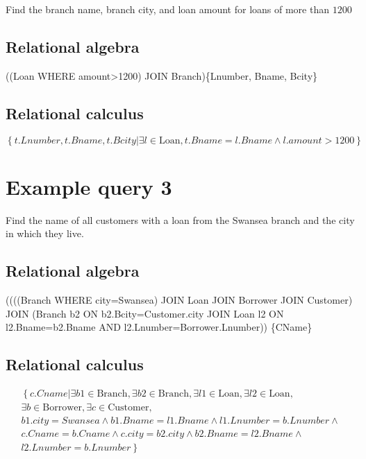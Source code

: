 \documentclass[
  14pt,
]{extarticle}
\begin{document}
Find the branch name, branch city, and loan amount for loans of more
than \(1200\)

\hypertarget{relational-algebra-2}{%
\subsection{Relational algebra}\label{relational-algebra-2}}

((Loan WHERE amount\textgreater1200) JOIN Branch)\{Lnumber, Bname,
Bcity\}

\vspace{7cm}

\hypertarget{relational-calculus-2}{%
\subsection{Relational calculus}\label{relational-calculus-2}}

\[
\left\{ t.Lnumber, t.Bname, t.Bcity | \exists l \in \text{Loan}, t.Bname=l.Bname \land l.amount > 1200 \right\}
\]

\newpage

\hypertarget{example-query-3}{%
\section{Example query 3}\label{example-query-3}}

Find the name of all customers with a loan from the Swansea branch and
the city in which they live.

\hypertarget{relational-algebra-3}{%
\subsection{Relational algebra}\label{relational-algebra-3}}

((((Branch WHERE city=Swansea) JOIN Loan JOIN Borrower JOIN Customer)
JOIN (Branch b2 ON b2.Bcity=Customer.city JOIN Loan l2 ON
l2.Bname=b2.Bname AND l2.Lnumber=Borrower.Lnumber)) \{CName\}

\vspace{7cm}

\hypertarget{relational-calculus-3}{%
\subsection{Relational calculus}\label{relational-calculus-3}}


\begin{multline*}
\left\{ c.Cname | \exists b1 \in \text{Branch}, \exists b2 \in \text{Branch}, \exists l1 \in \text{Loan}, \exists l2 \in \text{Loan}, \right. \\
\exists b \in \text{Borrower}, \exists c \in \text{Customer}, \\
b1.city=Swansea \land b1.Bname=l1.Bname \land l1.Lnumber=b.Lnumber \land \\
c.Cname=b.Cname \land c.city=b2.city \land b2.Bname=l2.Bname \land \\
\left. l2.Lnumber=b.Lnumber \right\}
\end{multline*}
\end{document}
